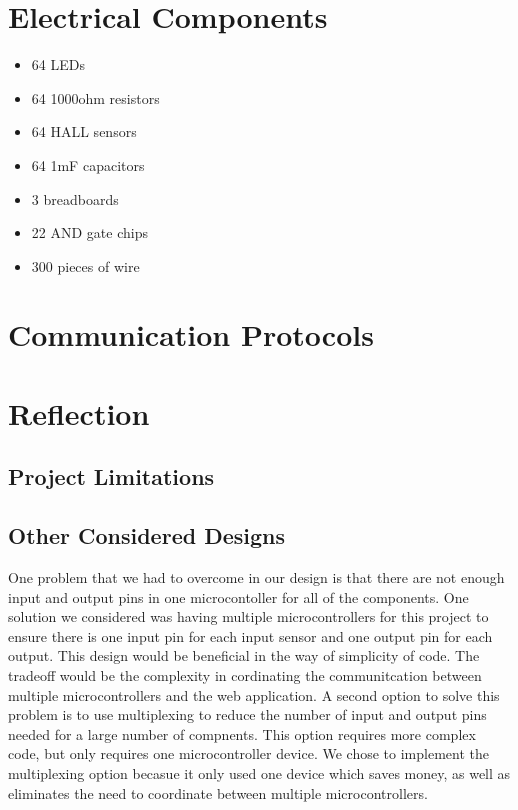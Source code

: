 \documentclass[12pt, titlepage]{article}
\begin{document}
\section{Electrical Components}
\begin{itemize}
  \item 64 LEDs
  \item 64 1000ohm resistors
  \item 64 HALL sensors
  \item 64 1mF capacitors
  \item 3 breadboards
  \item 22 AND gate chips
  \item 300 pieces of wire
\end{itemize}

\section{Communication Protocols}

\section{Reflection}

\subsection*{Project Limitations}

\subsection*{Other Considered Designs}
One problem that we had to overcome in our design is that there are not enough input and output pins in one microcontoller for all of the components.
One solution we considered was having multiple microcontrollers for this project to ensure there is one input pin for each input sensor and one output pin for each output.
This design would be beneficial in the way of simplicity of code. The tradeoff would be the complexity in cordinating the communitcation between multiple microcontrollers and the 
web application. A second option to solve this problem is to use multiplexing to reduce the number of input and output pins needed for a large number of compnents. 
This option requires more complex code, but only requires one microcontroller device. We chose to implement the multiplexing option becasue it only used one device which saves money,
as well as eliminates the need to coordinate between multiple microcontrollers. 
\end{document}

